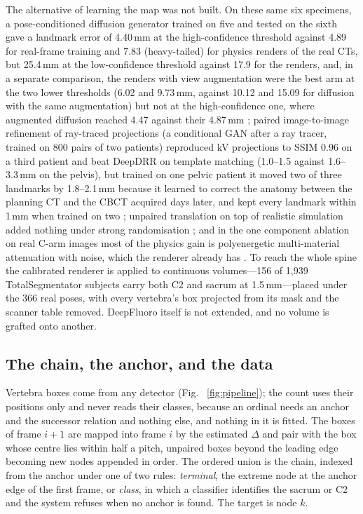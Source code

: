 \documentclass[11pt,letterpaper]{article}
\begin{document}
The alternative of learning the map was not built. On these same six specimens, a pose-conditioned
diffusion generator trained on five and tested on the sixth gave a landmark error of 4.40\,mm at the
high-confidence threshold against 4.89 for real-frame training and 7.83 (heavy-tailed) for physics
renders of the real CTs, but 25.4\,mm at the low-confidence threshold against 17.9 for the renders, and,
in a separate comparison, the renders with view augmentation were the best arm at the two lower
thresholds (6.02 and 9.73\,mm, against 10.12 and 15.09 for diffusion with the same augmentation) but not
at the high-confidence one, where augmented diffusion reached 4.47 against their 4.87\,mm
\citep{rapuri2026}; paired image-to-image
refinement of ray-traced projections (a conditional GAN after a ray tracer, trained on 800 pairs of two
patients) reproduced kV projections to SSIM 0.96 on a third patient and beat DeepDRR on template
matching (1.0--1.5 against 1.6--3.3\,mm on the pelvis), but trained on one pelvic patient it moved two of
three landmarks by 1.8--2.1\,mm because it learned to correct the anatomy between the planning CT and the
CBCT acquired days later, and kept every landmark within 1\,mm when trained on two \citep{dhont2020}; unpaired translation on top of realistic simulation added nothing under strong
randomisation \citep{synthex2023}; and in the one component ablation on real C-arm images most of the
physics gain is polyenergetic multi-material attenuation with noise, which the renderer already has
\citep{unberath2019}. To reach the whole spine the calibrated renderer is applied to continuous
volumes---156 of 1{,}939 TotalSegmentator subjects carry both C2 and sacrum at 1.5\,mm---placed under
the 366 real poses, with every vertebra's box projected from its mask and the scanner table removed.
DeepFluoro itself is not extended, and no volume is grafted onto another.

\subsection*{The chain, the anchor, and the data}
Vertebra boxes come from any detector (Fig.~
\ref{fig:pipeline}); the count uses their positions only and never reads their classes,
because an ordinal needs an anchor and the successor relation and nothing else, and nothing in it is fitted.
The boxes of frame $i{+}1$ are mapped into frame $i$ by the estimated $\Delta$ and pair with the box whose
centre lies within half a pitch, unpaired boxes beyond the leading edge becoming new nodes appended in
order. The ordered union is the chain, indexed from the anchor under one of two rules: \emph{terminal}, the
extreme node at the anchor edge of the first frame, or \emph{class}, in which a classifier identifies the
sacrum or C2 and the system refuses when no anchor is found. The target is node $k$.
\end{document}
